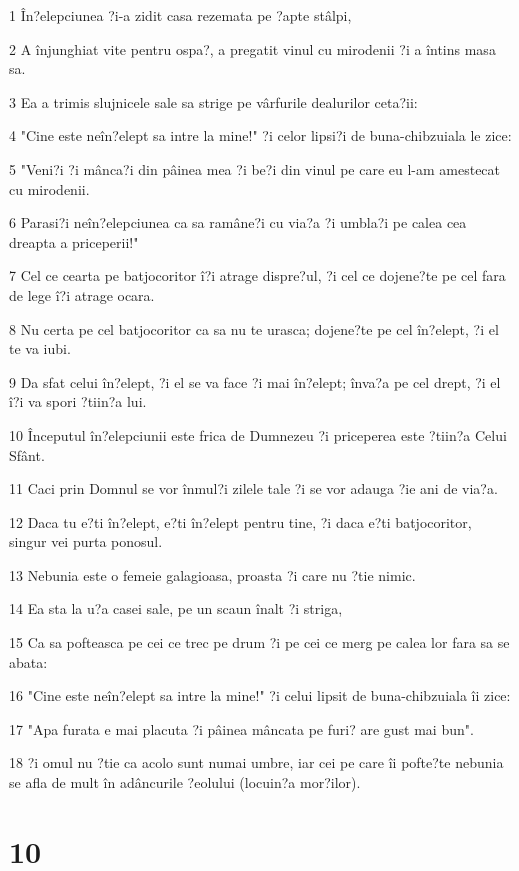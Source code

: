 \par 1 În?elepciunea ?i-a zidit casa rezemata pe ?apte stâlpi,
\par 2 A înjunghiat vite pentru ospa?, a pregatit vinul cu mirodenii ?i a întins masa sa.
\par 3 Ea a trimis slujnicele sale sa strige pe vârfurile dealurilor ceta?ii:
\par 4 "Cine este neîn?elept sa intre la mine!" ?i celor lipsi?i de buna-chibzuiala le zice:
\par 5 "Veni?i ?i mânca?i din pâinea mea ?i be?i din vinul pe care eu l-am amestecat cu mirodenii.
\par 6 Parasi?i neîn?elepciunea ca sa ramâne?i cu via?a ?i umbla?i pe calea cea dreapta a priceperii!"
\par 7 Cel ce cearta pe batjocoritor î?i atrage dispre?ul, ?i cel ce dojene?te pe cel fara de lege î?i atrage ocara.
\par 8 Nu certa pe cel batjocoritor ca sa nu te urasca; dojene?te pe cel în?elept, ?i el te va iubi.
\par 9 Da sfat celui în?elept, ?i el se va face ?i mai în?elept; înva?a pe cel drept, ?i el î?i va spori ?tiin?a lui.
\par 10 Începutul în?elepciunii este frica de Dumnezeu ?i priceperea este ?tiin?a Celui Sfânt.
\par 11 Caci prin Domnul se vor înmul?i zilele tale ?i se vor adauga ?ie ani de via?a.
\par 12 Daca tu e?ti în?elept, e?ti în?elept pentru tine, ?i daca e?ti batjocoritor, singur vei purta ponosul.
\par 13 Nebunia este o femeie galagioasa, proasta ?i care nu ?tie nimic.
\par 14 Ea sta la u?a casei sale, pe un scaun înalt ?i striga,
\par 15 Ca sa pofteasca pe cei ce trec pe drum ?i pe cei ce merg pe calea lor fara sa se abata:
\par 16 "Cine este neîn?elept sa intre la mine!" ?i celui lipsit de buna-chibzuiala îi zice:
\par 17 "Apa furata e mai placuta ?i pâinea mâncata pe furi? are gust mai bun".
\par 18 ?i omul nu ?tie ca acolo sunt numai umbre, iar cei pe care îi pofte?te nebunia se afla de mult în adâncurile ?eolului (locuin?a mor?ilor).

\chapter{10}

